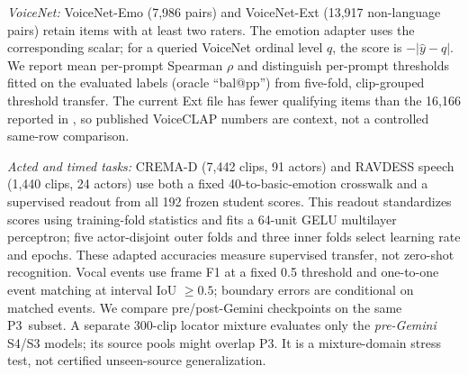\documentclass{article}
\newcommand{\pthree}{\textsc{P3}}
\begin{document}
\emph{VoiceNet:} VoiceNet-Emo (7,986 pairs) and VoiceNet-Ext (13,917 non-language pairs) retain items with at least two raters. The emotion adapter uses the corresponding scalar; for a queried VoiceNet ordinal level $q$, the score is $-|\hat y-q|$. We report mean per-prompt Spearman $\rho$ and distinguish per-prompt thresholds fitted on the evaluated labels (oracle ``bal@pp'') from five-fold, clip-grouped threshold transfer. The current Ext file has fewer qualifying items than the 16,166 reported in \citet{schuhmann2026voicenet}, so published VoiceCLAP numbers are context, not a controlled same-row comparison.

\emph{Acted and timed tasks:} CREMA-D (7,442 clips, 91 actors) and RAVDESS speech (1,440 clips, 24 actors) \citep{cao2014cremad,livingstone2018ravdess} use both a fixed 40-to-basic-emotion crosswalk and a supervised readout from all 192 frozen student scores. This readout standardizes scores using training-fold statistics and fits a 64-unit GELU multilayer perceptron; five actor-disjoint outer folds and three inner folds select learning rate and epochs. These adapted accuracies measure supervised transfer, not zero-shot recognition. Vocal events use frame F1 at a fixed 0.5 threshold and one-to-one event matching at interval IoU $\geq0.5$; boundary errors are conditional on matched events. We compare pre/post-Gemini checkpoints on the same \pthree\ subset. A separate 300-clip locator mixture evaluates only the \emph{pre-Gemini} S4/S3 models; its source pools might overlap \pthree. It is a mixture-domain stress test, not certified unseen-source generalization.
\end{document}
